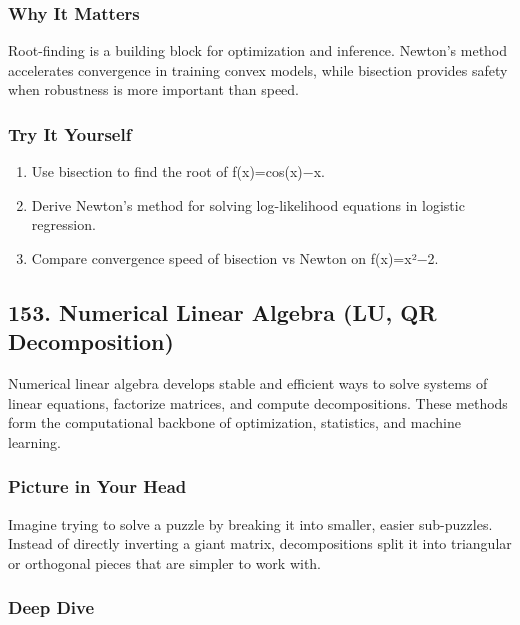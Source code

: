 \documentclass[
  letterpaper,
  DIV=11,
  numbers=noendperiod]{scrreprt}
\providecommand{\tightlist}{%
  \setlength{\itemsep}{0pt}\setlength{\parskip}{0pt}}
\begin{document}
\subsubsection{Why It Matters}\label{why-it-matters-49}

Root-finding is a building block for optimization and inference.
Newton's method accelerates convergence in training convex models, while
bisection provides safety when robustness is more important than speed.

\subsubsection{Try It Yourself}\label{try-it-yourself-151}

\begin{enumerate}
\def\labelenumi{\arabic{enumi}.}
\tightlist
\item
  Use bisection to find the root of f(x)=cos(x)−x.
\item
  Derive Newton's method for solving log-likelihood equations in
  logistic regression.
\item
  Compare convergence speed of bisection vs Newton on f(x)=x²−2.
\end{enumerate}

\subsection{153. Numerical Linear Algebra (LU, QR
Decomposition)}\label{numerical-linear-algebra-lu-qr-decomposition}

Numerical linear algebra develops stable and efficient ways to solve
systems of linear equations, factorize matrices, and compute
decompositions. These methods form the computational backbone of
optimization, statistics, and machine learning.

\subsubsection{Picture in Your Head}\label{picture-in-your-head-152}

Imagine trying to solve a puzzle by breaking it into smaller, easier
sub-puzzles. Instead of directly inverting a giant matrix,
decompositions split it into triangular or orthogonal pieces that are
simpler to work with.

\subsubsection{Deep Dive}\label{deep-dive-152}
\end{document}
